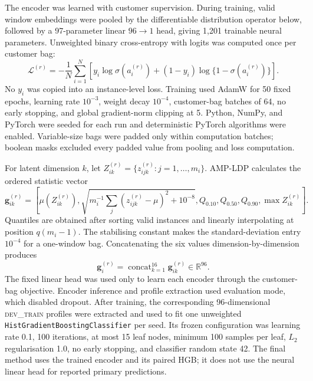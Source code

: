 The encoder was learned with customer supervision. During training, valid window embeddings were pooled by the differentiable distribution operator below, followed by a 97-parameter linear $96\rightarrow1$ head, giving 1,201 trainable neural parameters. Unweighted binary cross-entropy with logits was computed once per customer bag:
\begin{equation}
  \mathcal{L}^{(r)}=-\frac{1}{N}\sum_{i=1}^{N}
  \left[y_i\log\sigma(a_i^{(r)})+(1-y_i)\log\{1-\sigma(a_i^{(r)})\}\right].
  \label{eq:bag-loss}
\end{equation}
No $y_i$ was copied into an instance-level loss. Training used AdamW for 50 fixed epochs, learning rate $10^{-3}$, weight decay $10^{-4}$, customer-bag batches of 64, no early stopping, and global gradient-norm clipping at 5. Python, NumPy, and PyTorch were seeded for each run and deterministic PyTorch algorithms were enabled. Variable-size bags were padded only within computation batches; boolean masks excluded every padded value from pooling and loss computation.

For latent dimension $k$, let $Z_{ik}^{(r)}=\{z_{ijk}^{(r)}:j=1,\ldots,m_i\}$. AMP-LDP calculates the ordered statistic vector
\begin{equation}
  \mathbf{g}_{ik}^{(r)}=\left[
  \mu(Z_{ik}^{(r)}),
  \sqrt{m_i^{-1}\!\sum_j(z_{ijk}^{(r)}-\mu)^2+10^{-8}},
  Q_{0.10},Q_{0.50},Q_{0.90},\max Z_{ik}^{(r)}
  \right].
  \label{eq:distribution-pooling}
\end{equation}
Quantiles are obtained after sorting valid instances and linearly interpolating at position $q(m_i-1)$. The stabilising constant makes the standard-deviation entry $10^{-4}$ for a one-window bag. Concatenating the six values dimension-by-dimension produces
\begin{equation}
  \mathbf{g}_{i}^{(r)}=\mathop{\mathrm{concat}}_{k=1}^{16}\mathbf{g}_{ik}^{(r)}
  \in\mathbb{R}^{96}.
  \label{eq:latent-profile}
\end{equation}
The fixed linear head was used only to learn each encoder through the customer-bag objective. Encoder inference and profile extraction used evaluation mode, which disabled dropout. After training, the corresponding 96-dimensional \textsc{dev\_train} profiles were extracted and used to fit one unweighted \texttt{HistGradientBoostingClassifier} per seed. Its frozen configuration was learning rate 0.1, 100 iterations, at most 15 leaf nodes, minimum 100 samples per leaf, $L_2$ regularisation 1.0, no early stopping, and classifier random state 42. The final method uses the trained encoder and its paired HGB; it does not use the neural linear head for reported primary predictions.

